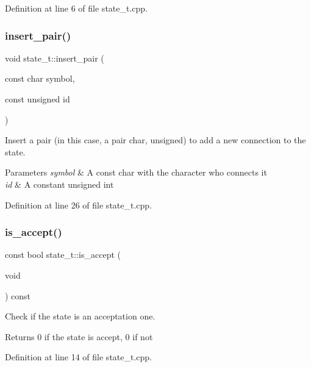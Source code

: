 Definition at line 6 of file state\+\_\+t.\+cpp.

\mbox{\label{classstate__t_a8a18ea542fd131b22dfee5897caab79e}} 
\subsubsection{insert\+\_\+pair()}
{\footnotesize\ttfamily void state\+\_\+t\+::insert\+\_\+pair (\begin{DoxyParamCaption}\item[{const char}]{symbol,  }\item[{const unsigned}]{id }\end{DoxyParamCaption})}



Insert a pair (in this case, a pair char, unsigned) to add a new connection to the state. 


\begin{DoxyParams}{Parameters}
{\em symbol} & A const char with the character who connects it \\
\hline
{\em id} & A constant unsigned int \\
\hline
\end{DoxyParams}


Definition at line 26 of file state\+\_\+t.\+cpp.

\mbox{\label{classstate__t_a83874dc98292ca29be83680dee6f9456}} 
\subsubsection{is\+\_\+accept()}
{\footnotesize\ttfamily const bool state\+\_\+t\+::is\+\_\+accept (\begin{DoxyParamCaption}\item[{void}]{ }\end{DoxyParamCaption}) const}



Check if the state is an acceptation one. 

\begin{DoxyReturn}{Returns}
0 if the state is accept, 0 if not 
\end{DoxyReturn}


Definition at line 14 of file state\+\_\+t.\+cpp.

